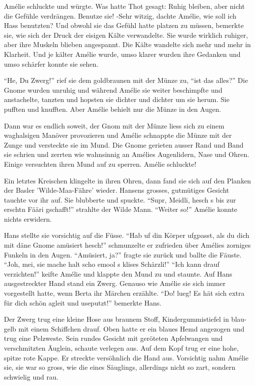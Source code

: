 \documentclass[11pt,titlepage,a5paper]{book}
\begin{document}
Amélie schluckte und würgte. Was hatte Thot gesagt: Ruhig bleiben, aber nicht die Gefühle verdrängen. Benutze sie! -Sehr witzig, dachte Amélie, wie soll ich Hass benutzten? Und obwohl sie das Gefühl hatte platzen zu müssen, bemerkte sie, wie sich der Druck der eisigen Kälte verwandelte. Sie wurde wirklich ruhiger, aber ihre Muskeln blieben angespannt. Die Kälte wandelte sich mehr und mehr in Klarheit. Und je kälter Amélie wurde, umso klarer wurden ihre Gedanken und umso schärfer konnte sie sehen. 

"`He, Du Zwerg!"' rief sie dem goldbraunen mit der Münze zu, "`ist das alles?"' Die Gnome wurden unruhig und während Amélie sie weiter beschimpfte und anstachelte, tanzten und hopsten sie dichter und dichter um sie herum. Sie pufften und knufften. Aber Amélie behielt nur die Münze in den Augen.

Dann war es endlich soweit, der Gnom mit der Münze liess sich zu einem waghalsigen Manöver provozieren und Amélie schnappte die Münze mit der Zunge und versteckte sie im Mund. Die Gnome gerieten ausser Rand und Band sie schrien und zerrten wie wahnsinnig an Amélies Augenlidern, Nase und Ohren. Einige versuchten ihren Mund auf zu sperren. Amélie schluckte!

Ein letztes Kreischen klingelte in ihren Ohren, dann fand sie sich auf den Planken der Basler 'Wilde-Maa-Fähre' wieder. Hansens grosses, gutmütiges Gesicht tauchte vor ihr auf. Sie blubberte und spuckte. "`Supr, Meidli, hesch s bis zur erschtn Fääri gschafft!"' strahlte der Wilde Mann. "`Weiter so!"' Amélie konnte nichts erwidern.

Hans stellte sie vorsichtig auf die Füsse. "`Hab uf din Körper ufgpasst, als du dich mit däne Gnome amüsiert hesch!"' schmunzelte er zufrieden über Amélies zorniges Funkeln in den Augen. "`Amüsiert, ja?"' fragte sie zurück und ballte die Fäuste. "`Joh, mei, sie mache halt scho emool s klises Schärzli!"' "`Ich kann drauf verzichten!"' keifte Amélie und klappte den Mund zu und staunte. Auf Hans ausgestreckter Hand stand ein Zwerg. Genauso wie Amélie sie sich immer vorgestellt hatte, wenn Berta ihr Märchen erzählte. "`Do! lueg! Es hät sich extra für dich schön agleit und useputzt!"' bemerkte Hans.

Der Zwerg trug eine kleine Hose aus braunem Stoff, Kindergummistiefel in blau-gelb mit einem Schiffchen drauf. Oben hatte er ein blaues Hemd angezogen und trug eine Pelzweste. Sein rundes Gesicht mit geröteten Apfelwangen und verschmitzten Äuglein, schaute verlegen aus. Auf dem Kopf trug er eine hohe, spitze rote Kappe. Er streckte versöhnlich die Hand aus. Vorsichtig nahm Amélie sie, sie war so gross, wie die eines Säuglings, allerdings nicht so zart, sondern schwielig und rau.
\end{document}
